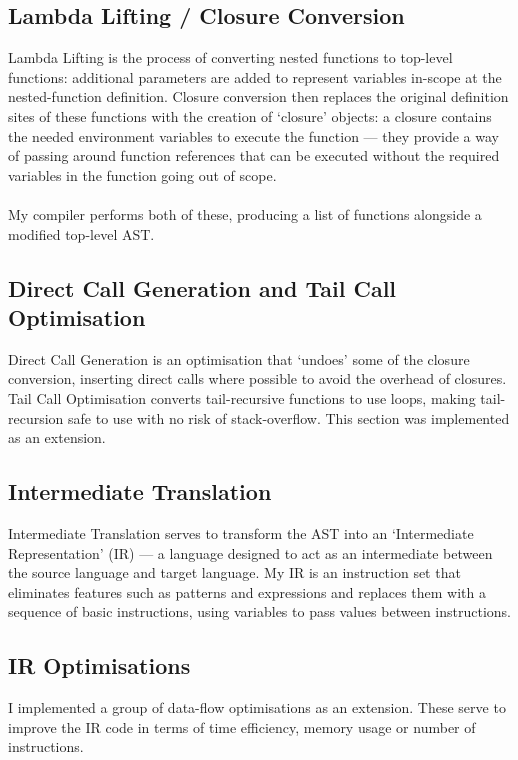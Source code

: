 \subsection{Lambda Lifting / Closure Conversion}
Lambda Lifting is the process of converting nested functions to top-level functions: additional parameters are added to represent variables in-scope at the nested-function definition. Closure conversion then replaces the original definition sites of these functions with the creation of `closure' objects: a closure contains the needed environment variables to execute the function --- they provide a way of passing around function references that can be executed without the required variables in the function going out of scope.
\\\\
My compiler performs both of these, producing a list of functions alongside a modified top-level AST.

\subsection{Direct Call Generation and Tail Call Optimisation}
Direct Call Generation is an optimisation that `undoes' some of the closure conversion, inserting direct calls where possible to avoid the overhead of closures. Tail Call Optimisation converts tail-recursive functions to use loops, making tail-recursion safe to use with no risk of stack-overflow. This section was implemented as an extension.

\subsection{Intermediate Translation}
Intermediate Translation serves to transform the AST into an `Intermediate Representation' (IR) --- a language designed to act as an intermediate between the source language and target language. My IR is an instruction set that eliminates features such as patterns and expressions and replaces them with a sequence of basic instructions, using variables to pass values between instructions.

\subsection{IR Optimisations}
I implemented a group of data-flow optimisations as an extension. These serve to improve the IR code in terms of time efficiency, memory usage or number of instructions.


